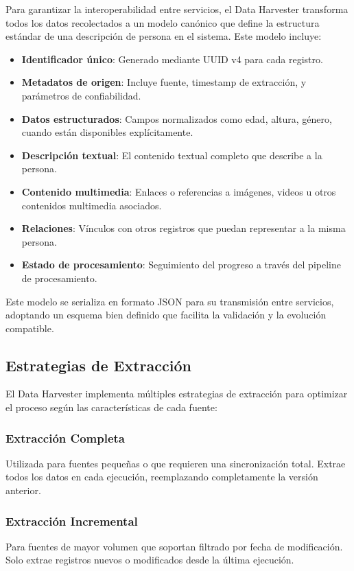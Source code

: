 \documentclass[12pt,a4paper]{article}
\begin{document}
Para garantizar la interoperabilidad entre servicios, el Data Harvester transforma todos los datos recolectados a un modelo canónico que define la estructura estándar de una descripción de persona en el sistema. Este modelo incluye:

\begin{itemize}
    \item \textbf{Identificador único}: Generado mediante UUID v4 para cada registro.
    \item \textbf{Metadatos de origen}: Incluye fuente, timestamp de extracción, y parámetros de confiabilidad.
    \item \textbf{Datos estructurados}: Campos normalizados como edad, altura, género, cuando están disponibles explícitamente.
    \item \textbf{Descripción textual}: El contenido textual completo que describe a la persona.
    \item \textbf{Contenido multimedia}: Enlaces o referencias a imágenes, videos u otros contenidos multimedia asociados.
    \item \textbf{Relaciones}: Vínculos con otros registros que puedan representar a la misma persona.
    \item \textbf{Estado de procesamiento}: Seguimiento del progreso a través del pipeline de procesamiento.
\end{itemize}

Este modelo se serializa en formato JSON para su transmisión entre servicios, adoptando un esquema bien definido que facilita la validación y la evolución compatible.

\subsection{Estrategias de Extracción}
\label{subsec:dh-estrategias}

El Data Harvester implementa múltiples estrategias de extracción para optimizar el proceso según las características de cada fuente:

\subsubsection{Extracción Completa}
Utilizada para fuentes pequeñas o que requieren una sincronización total. Extrae todos los datos en cada ejecución, reemplazando completamente la versión anterior.

\subsubsection{Extracción Incremental}
Para fuentes de mayor volumen que soportan filtrado por fecha de modificación. Solo extrae registros nuevos o modificados desde la última ejecución.
\end{document}
